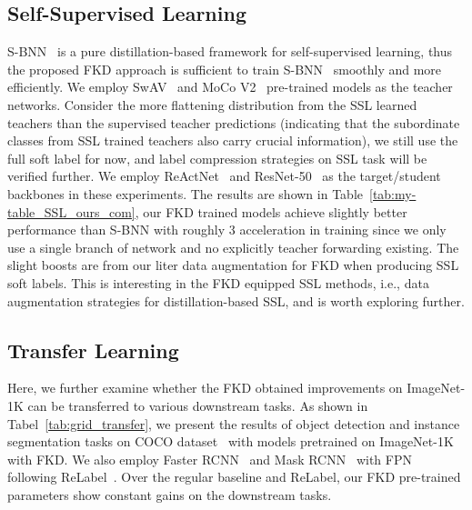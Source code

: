 \documentclass[10pt,twocolumn,letterpaper]{article}
\begin{document}
\subsection{Self-Supervised Learning}

S-BNN~\cite{shen2021s2} is a pure distillation-based framework for self-supervised learning, thus the proposed FKD approach is sufficient to train S-BNN~\cite{shen2021s2} smoothly and more efficiently. We employ  SwAV~\cite{caron2020unsupervised} and MoCo V2~\cite{chen2020improved} pre-trained models as the teacher networks. Consider the more flattening distribution from the SSL learned teachers than the supervised teacher predictions (indicating that the subordinate classes from SSL trained teachers also carry crucial information), we still use the full soft label for now, and label compression strategies on SSL task will be verified further. We employ ReActNet~\cite{liu2020reactnet} and ResNet-50~\cite{he2016deep} as the target/student backbones in these experiments. The results are shown in Table~\ref{tab:my-table_SSL_ours_com}, our FKD trained models achieve slightly better performance than S-BNN with roughly 3 acceleration in training since we only use a single branch of network and no explicitly teacher forwarding existing. The slight boosts are from our liter data augmentation for FKD  when producing SSL soft labels. This is interesting in the FKD equipped SSL methods, i.e., data augmentation strategies for distillation-based SSL, and is worth exploring further. 

\subsection{Transfer Learning}

Here, we further examine whether the FKD obtained improvements on ImageNet-1K can be transferred to various downstream tasks. As shown in Tabel~\ref{tab:grid_transfer}, we present the results of object detection and instance segmentation tasks on COCO dataset~\cite{lin2014microsoft} with models pretrained on ImageNet-1K with FKD. We also employ Faster RCNN~\cite{ren2015faster} and Mask RCNN~\cite{he2017mask} with FPN~\cite{lin2017feature} following ReLabel~\cite{yun2021re}. Over the regular baseline and ReLabel, our FKD pre-trained parameters show constant gains on the downstream tasks.
\end{document}
